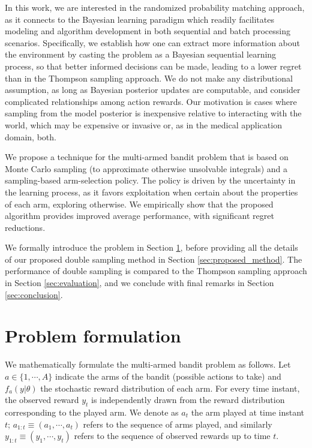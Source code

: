 \documentclass[10pt]{article}
\begin{document}
In this work, we are interested in the randomized probability matching approach, as it connects to the Bayesian learning paradigm which readily facilitates modeling and algorithm development in both sequential and batch processing scenarios. Specifically, we establish how one can extract more information about the environment by casting the problem as a Bayesian sequential learning process, so that better informed decisions can be made, leading to a lower regret than in the Thompson sampling approach. We do not make any distributional assumption, as long as Bayesian posterior updates are computable, and consider complicated relationships among action rewards. Our motivation is cases where sampling from the model posterior is inexpensive relative to interacting with the world, which may be expensive or invasive or, as in the medical application domain, both.

We propose a technique for the multi-armed bandit problem that is based on Monte Carlo sampling (to approximate otherwise unsolvable integrals) and a sampling-based arm-selection policy. The policy is driven by the uncertainty in the learning process, as it favors exploitation when certain about the properties of each arm, exploring otherwise. We empirically show that the proposed algorithm provides improved average performance, with significant regret reductions.

We formally introduce the problem in Section \ref{sec:problem_formulation}, before providing all the details of our proposed double sampling method in Section \ref{sec:proposed_method}. The performance of 
double sampling
is compared to the Thompson sampling approach in Section \ref{sec:evaluation}, and we conclude with final remarks in Section \ref{sec:conclusion}.

\section{Problem formulation}
\label{sec:problem_formulation}

We mathematically formulate the multi-armed bandit problem as follows. Let $a\in\{1,\cdots,A\}$ indicate the arms of the bandit (possible actions to take) and $f_{a}(y|\theta)$ the stochastic reward distribution of each arm. For every time instant, the observed reward $y_t$ is independently drawn from the reward distribution corresponding to the played arm. We denote as $a_t$ the arm played at time instant $t$; $a_{1:t} \equiv (a_1, \cdots , a_t)$ refers to the sequence of arms played, and similarly $y_{1:t} \equiv (y_1, \cdots , y_t)$ refers to the sequence of observed rewards up to time $t$.
\end{document}
